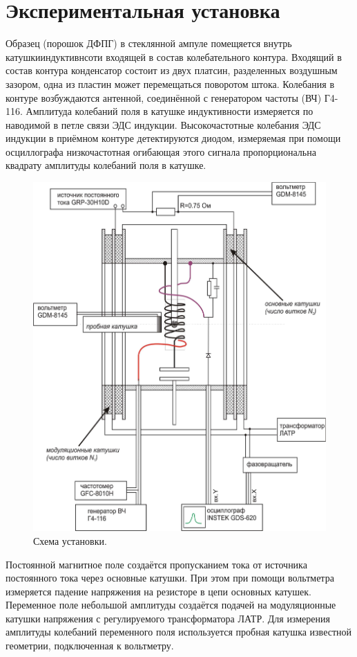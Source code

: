 \documentclass[a4paper, 12pt]{article}
\begin{document}
\section{Экспериментальная установка}
	Образец (порошок ДФПГ) в стеклянной ампуле помещяется внутрь катушкииндуктивнсоти входящей в состав колебательного контура. Входящий в состав контура конденсатор состоит из двух платсин, разделенных воздушным зазором, одна из пластин может перемещаться поворотом штока. Колебания в контуре возбуждаются антенной, соединённой с генератором частоты (ВЧ) Г4-116. Амплитуда колебаний поля в катушке индуктивности измеряется по наводимой в петле связи ЭДС индукции. Высокочастотные колебания ЭДС индукции в приёмном контуре детектируются диодом, измеряемая при помощи осциллографа низкочастотная огибающая этого сигнала пропорциональна квадрату амплитуды колебаний поля в катушке.
	\begin{figure}[h!]
	    \centering
			\caption{Схема установки.}
			\label{fig:equip}
			\includegraphics[scale=0.17]{equip.png}
	\end{figure}
	
	Постоянной магнитное поле создаётся пропусканием тока от источника постоянного тока через основные катушки. При этом при помощи вольтметра измеряется падение напряжения на резисторе в цепи основных катушек. Переменное поле небольшой амплитуды создаётся подачей на модуляционные катушки напряжения с регулируемого трансформатора ЛАТР. Для измерения амплитуды колебаний переменного поля используется пробная катушка известной геометрии, подключенная к вольтметру.
	
\end{document}
